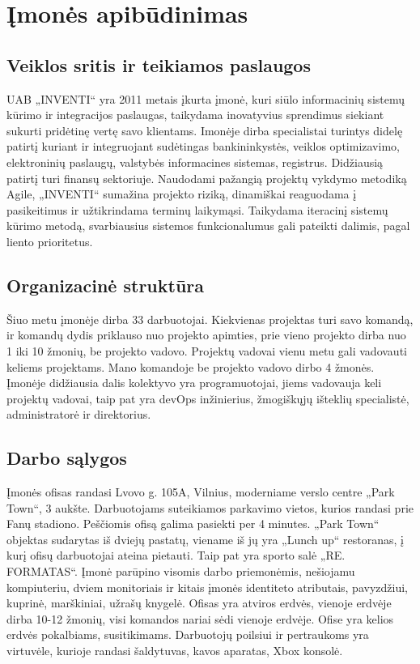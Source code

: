 \section{Įmonės apibūdinimas}

\subsection{Veiklos sritis ir teikiamos paslaugos}
UAB „INVENTI“ yra 2011 metais įkurta įmonė, kuri siūlo informacinių sistemų kūrimo ir integracijos paslaugas,
taikydama inovatyvius sprendimus siekiant sukurti pridėtinę vertę savo klientams.
Imonėje dirba specialistai turintys didelę patirtį kuriant ir integruojant sudėtingas bankininkystės, veiklos optimizavimo, elektroninių paslaugų,
valstybės informacines sistemas, registrus. Didžiausią patirtį turi finansų sektoriuje.
Naudodami pažangią projektų vykdymo metodiką Agile, „INVENTI“ sumažina projekto riziką, dinamiškai reaguodama į pasikeitimus ir užtikrindama terminų laikymąsi.
Taikydama iteracinį sistemų kūrimo metodą, svarbiausius sistemos funkcionalumus gali pateikti dalimis, pagal liento prioritetus.


\subsection{Organizacinė struktūra}
Šiuo metu įmonėje dirba 33 darbuotojai. Kiekvienas projektas turi savo komandą,
ir komandų dydis priklauso nuo projekto apimties, prie vieno projekto dirba nuo 1 iki 10 žmonių, be projekto vadovo. Projektų vadovai vienu metu gali
vadovauti keliems projektams. Mano komandoje be projekto vadovo dirbo 4 žmonės. Įmonėje didžiausia dalis kolektyvo yra programuotojai, jiems vadovauja keli projektų vadovai,
taip pat yra devOps inžinierius, žmogiškųjų išteklių specialistė, administratorė ir direktorius.


\subsection{Darbo sąlygos}
Įmonės ofisas randasi Lvovo g. 105A, Vilnius, moderniame verslo centre „Park Town“, 3 aukšte. Darbuotojams suteikiamos parkavimo vietos, kurios randasi prie Fanų stadiono.
Peščiomis ofisą galima pasiekti per 4 minutes. „Park Town“ objektas sudarytas iš dviejų pastatų, viename iš jų yra „Lunch up“ restoranas, į kurį ofisų darbuotojai ateina pietauti.
Taip pat yra sporto salė „RE. FORMATAS“. Įmonė parūpino visomis darbo priemonėmis, nešiojamu kompiuteriu, dviem monitoriais ir kitais įmonės identiteto atributais, pavyzdžiui,
kuprinė, marškiniai, užrašų knygelė. Ofisas yra atviros erdvės, vienoje erdvėje dirba 10-12 žmonių, visi komandos nariai sėdi vienoje erdvėje.
Ofise yra kelios erdvės pokalbiams, susitikimams. Darbuotojų poilsiui ir pertraukoms yra virtuvėle, kurioje randasi šaldytuvas, kavos aparatas, Xbox konsolė.